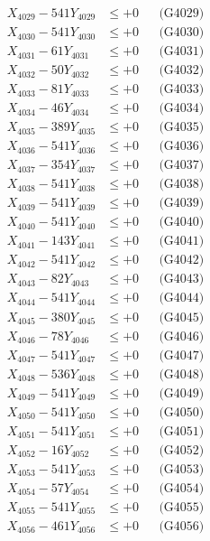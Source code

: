 \documentclass[a4paper,10pt]{article}
\begin{document}
{\begin{align}
X_{4029} - 541Y_{4029} &\leq +0 && \text{(G4029)} \\
X_{4030} - 541Y_{4030} &\leq +0 && \text{(G4030)} \\
\allowbreak
X_{4031} - 61Y_{4031} &\leq +0 && \text{(G4031)} \\
X_{4032} - 50Y_{4032} &\leq +0 && \text{(G4032)} \\
X_{4033} - 81Y_{4033} &\leq +0 && \text{(G4033)} \\
X_{4034} - 46Y_{4034} &\leq +0 && \text{(G4034)} \\
X_{4035} - 389Y_{4035} &\leq +0 && \text{(G4035)} \\
X_{4036} - 541Y_{4036} &\leq +0 && \text{(G4036)} \\
X_{4037} - 354Y_{4037} &\leq +0 && \text{(G4037)} \\
X_{4038} - 541Y_{4038} &\leq +0 && \text{(G4038)} \\
X_{4039} - 541Y_{4039} &\leq +0 && \text{(G4039)} \\
X_{4040} - 541Y_{4040} &\leq +0 && \text{(G4040)} \\
\allowbreak
X_{4041} - 143Y_{4041} &\leq +0 && \text{(G4041)} \\
X_{4042} - 541Y_{4042} &\leq +0 && \text{(G4042)} \\
X_{4043} - 82Y_{4043} &\leq +0 && \text{(G4043)} \\
X_{4044} - 541Y_{4044} &\leq +0 && \text{(G4044)} \\
X_{4045} - 380Y_{4045} &\leq +0 && \text{(G4045)} \\
X_{4046} - 78Y_{4046} &\leq +0 && \text{(G4046)} \\
X_{4047} - 541Y_{4047} &\leq +0 && \text{(G4047)} \\
X_{4048} - 536Y_{4048} &\leq +0 && \text{(G4048)} \\
X_{4049} - 541Y_{4049} &\leq +0 && \text{(G4049)} \\
X_{4050} - 541Y_{4050} &\leq +0 && \text{(G4050)} \\
\allowbreak
X_{4051} - 541Y_{4051} &\leq +0 && \text{(G4051)} \\
X_{4052} - 16Y_{4052} &\leq +0 && \text{(G4052)} \\
X_{4053} - 541Y_{4053} &\leq +0 && \text{(G4053)} \\
X_{4054} - 57Y_{4054} &\leq +0 && \text{(G4054)} \\
X_{4055} - 541Y_{4055} &\leq +0 && \text{(G4055)} \\
X_{4056} - 461Y_{4056} &\leq +0 && \text{(G4056)} \\

\end{align}}
\end{document}
